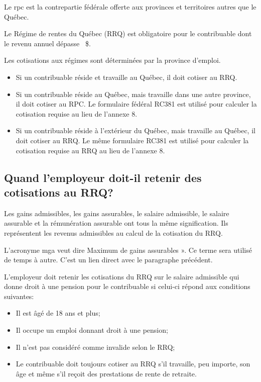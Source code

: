Le \acrfull{rpc} est la contrepartie fédérale offerte aux provinces et territoires autres que le Québec. 

Le Régime de rentes du Québec (RRQ) est obligatoire pour le contribuable dont le revenu annuel dépasse ~\$.

Les cotisations aux régimes sont déterminées par la province d'emploi.
\begin{itemize}
	\item Si un contribuable réside et travaille au Québec, il doit cotiser au RRQ.
	\item Si un contribuable réside au Québec, mais travaille dans une autre province, il doit cotiser au RPC. Le formulaire fédéral RC381 est utilisé pour calculer la cotisation requise au lieu de l'annexe 8.
	\item Si un contribuable réside à l'extérieur du Québec, mais travaille au Québec, il doit cotiser au RRQ. Le même formulaire RC381 est utilisé pour calculer la cotisation requise au RRQ au lieu de l'annexe 8.
\end{itemize}


\subsection{Quand l'employeur doit-il retenir des cotisations au RRQ?}
\begin{note}
	Les gains admissibles, les gains assurables, le salaire admissible, le salaire assurable et la rémunération assurable ont tous la même signification. Ils représentent les revenus admissibles au calcul de la cotisation du RRQ.
	
	
	L'acronyme \acrshort{mga} veut dire \og Maximum de gains assurables ». Ce terme sera utilisé de temps à autre. C'est un lien direct avec le paragraphe précédent.
\end{note}

L'employeur doit retenir les cotisations du RRQ sur le salaire admissible qui donne droit à une pension pour le contribuable si celui-ci répond aux conditions suivantes:
\begin{itemize}
	\item Il est âgé de 18 ans et plus;
	\item Il occupe un emploi donnant droit à une pension;
	\item Il n'est pas considéré comme invalide selon le RRQ;
	\item Le contribuable doit toujours cotiser au RRQ s'il travaille, peu importe, son âge et même s'il reçoit des prestations de rente de retraite.
\end{itemize}

